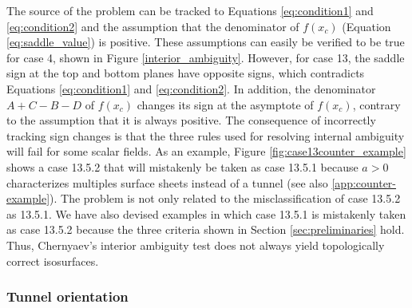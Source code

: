 The source of the problem can be tracked to Equations \ref{eq:condition1} and \ref{eq:condition2} and the assumption that the denominator of $f(x_c)$ (Equation \eqref{eq:saddle_value}) is positive. 
These assumptions can easily be verified to be true for case 4, shown in Figure \ref{interior_ambiguity}. However, for case 13, the saddle sign at the top and bottom planes have opposite signs, which contradicts Equations \eqref{eq:condition1} and \eqref{eq:condition2}. In addition, the denominator $A+C-B-D$ of $f(x_c)$ changes its sign at the asymptote of $f(x_c)$, contrary to the assumption that it is always positive.
%
The consequence of incorrectly tracking sign changes is that the three rules used for resolving internal ambiguity will fail for some scalar fields. As an example, Figure \ref{fig:case13counter_example} shows a case 13.5.2 that will mistakenly be taken as case 13.5.1 because  $a > 0$ characterizes multiples surface sheets instead of a tunnel (see also \ref{app:counter-example}).
%
The problem is not only related to the misclassification of case 13.5.2 as 13.5.1. We have also devised examples in which case 13.5.1 is mistakenly taken as case 13.5.2 because the three criteria shown in Section \ref{sec:preliminaries} hold. Thus, Chernyaev's interior ambiguity test does not always yield topologically correct isosurfaces.

\subsubsection{Tunnel orientation}

